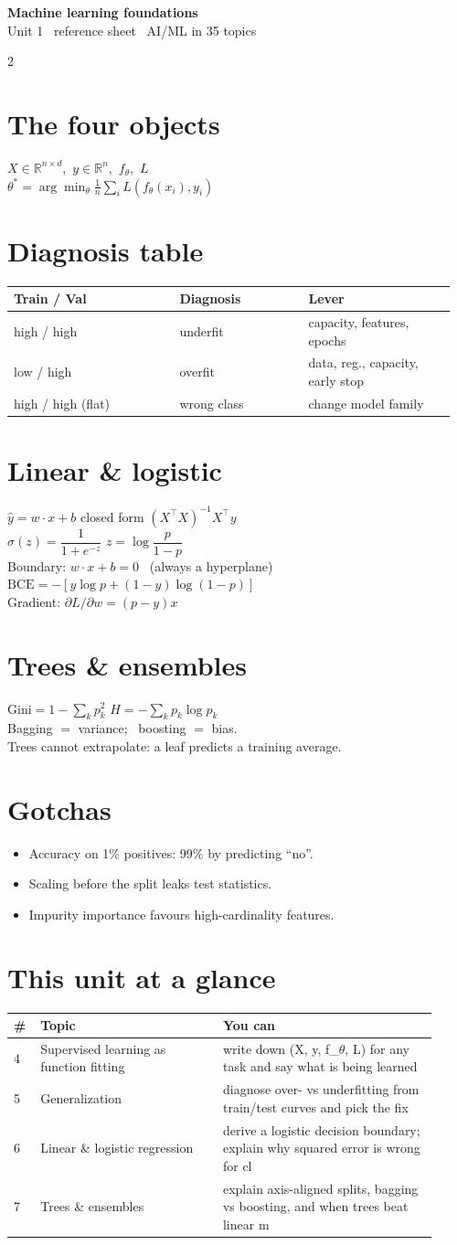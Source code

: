 \documentclass[11pt,a4paper]{article}
\newcommand{\sect}[1]{\section*{#1}}
\newcommand{\hd}[2]{\begin{center}{\large\bfseries #1}\\[-0.1em]{\small\color{gray}#2}\end{center}\vspace{-0.6em}}
\begin{document}
\hd{Machine learning foundations}{Unit 1 \textperiodcentered\ reference sheet \textperiodcentered\ AI/ML in 35 topics}
\begin{multicols}{2}
\normalsize

\sect{The four objects}
$X\in\mathbb{R}^{n\times d}$,\ $y\in\mathbb{R}^{n}$,\ $f_\theta$,\ $L$\\
$\theta^*=\arg\min_\theta \frac1n\sum_i L(f_\theta(x_i),y_i)$

\sect{Diagnosis table}
\begin{tabular}{@{}p{0.36\linewidth}p{0.28\linewidth}p{0.32\linewidth}@{}}
\toprule
Train / Val & Diagnosis & Lever\\
\midrule
high / high & underfit & capacity, features, epochs\\
low / high & overfit & data, reg., capacity, early stop\\
high / high (flat) & wrong class & change model family\\
\bottomrule
\end{tabular}

\sect{Linear \& logistic}
$\hat y=w\cdot x+b$ \quad closed form $(X^\top X)^{-1}X^\top y$\\
$\sigma(z)=\dfrac{1}{1+e^{-z}}$ \quad $z=\log\dfrac{p}{1-p}$\\
Boundary: $w\cdot x+b=0$ \ (always a hyperplane)\\
$\mathrm{BCE}=-[y\log p+(1-y)\log(1-p)]$\\
Gradient: $\partial L/\partial w=(p-y)x$

\sect{Trees \& ensembles}
$\mathrm{Gini}=1-\sum_k p_k^2$ \quad $H=-\sum_k p_k\log p_k$\\
Bagging $=$ variance; \ boosting $=$ bias.\\
Trees cannot extrapolate: a leaf predicts a training average.

\sect{Gotchas}
\begin{itemize}
\item Accuracy on 1\% positives: 99\% by predicting ``no''.
\item Scaling before the split leaks test statistics.
\item Impurity importance favours high-cardinality features.
\end{itemize}

\sect{This unit at a glance}
\begin{tabular}{@{}p{0.05\linewidth}p{0.40\linewidth}p{0.47\linewidth}@{}}
\toprule
\# & Topic & You can\\
\midrule
4 & Supervised learning as function fitting & write down (X, y, f\_$\theta$, L) for any task and say what is being learned\\
5 & Generalization & diagnose over- vs underfitting from train/test curves and pick the fix\\
6 & Linear \& logistic regression & derive a logistic decision boundary; explain why squared error is wrong for cl\\
7 & Trees \& ensembles & explain axis-aligned splits, bagging vs boosting, and when trees beat linear m\\
\bottomrule
\end{tabular}


\end{multicols}
\end{document}
